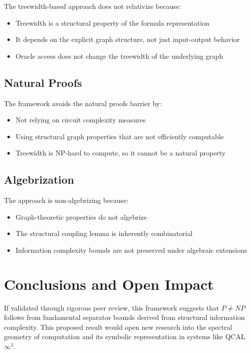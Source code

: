 \documentclass[11pt]{article}
\begin{document}
The treewidth-based approach does not relativize because:
\begin{itemize}
\item Treewidth is a structural property of the formula representation
\item It depends on the explicit graph structure, not just input-output behavior
\item Oracle access does not change the treewidth of the underlying graph
\end{itemize}

\subsection{Natural Proofs}

The framework avoids the natural proofs barrier by:
\begin{itemize}
\item Not relying on circuit complexity measures
\item Using structural graph properties that are not efficiently computable
\item Treewidth is NP-hard to compute, so it cannot be a natural property
\end{itemize}

\subsection{Algebrization}

The approach is non-algebrizing because:
\begin{itemize}
\item Graph-theoretic properties do not algebrize
\item The structural coupling lemma is inherently combinatorial
\item Information complexity bounds are not preserved under algebraic extensions
\end{itemize}

\section{Conclusions and Open Impact}

If validated through rigorous peer review, this framework suggests that $P \neq NP$ follows from fundamental separator bounds derived from structural information complexity. This proposed result would open new research into the spectral geometry of computation and its symbolic representation in systems like QCAL $\infty^3$.
\end{document}
